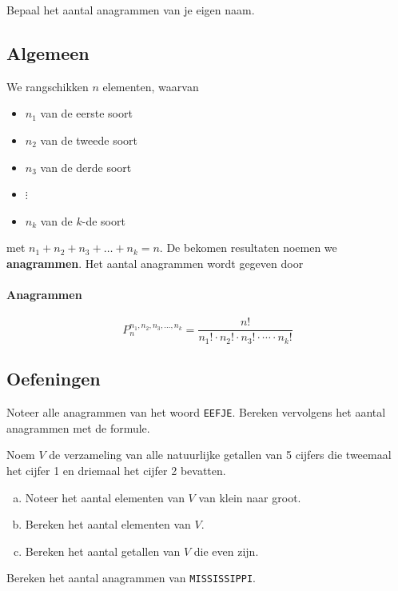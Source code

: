 \documentclass[12pt,twoside]{article}
\begin{document}
\begin{theorie}
Bepaal het aantal anagrammen van je eigen naam.

\subsection{Algemeen}

We rangschikken $n$ elementen, waarvan
\begin{itemize}
  \item $n_1$ van de eerste soort
  \item $n_2$ van de tweede soort
  \item $n_3$ van de derde soort
  \item $\vdots$
  \item $n_k$ van de $k$-de soort
\end{itemize}
met $n_1+n_2+n_3+\dots+n_k=n$. De bekomen resultaten noemen we {\bf anagrammen}. Het aantal anagrammen wordt gegeven door

\paragraph*{Anagrammen}
\begin{mdframed}
$$P^{n_1,n_2,n_3,\dots,n_k}_n = \dfrac{n!}{n_1!\cdot n_2!\cdot n_3!\cdot \cdots \cdot n_k!}$$
\end{mdframed}

\subsection{Oefeningen}

\end{theorie}

\vspace*{-0.5cm}
\begin{oefening}
Noteer alle anagrammen van het woord \verb#EEFJE#. Bereken vervolgens het aantal anagrammen met de formule.
\end{oefening}

\begin{oefening}
Noem $V$ de verzameling van alle natuurlijke getallen van 5 cijfers die tweemaal het cijfer 1 en driemaal het cijfer 2 bevatten.
\begin{enumerate}[(a)]
  \item Noteer het aantal elementen van $V$ van klein naar groot.
  \item Bereken het aantal elementen van $V$.
  \item Bereken het aantal getallen van $V$ die even zijn.
\end{enumerate}
\end{oefening}

\begin{oefening}
Bereken het aantal anagrammen van \verb#MISSISSIPPI#.
\end{oefening}

\end{document}
